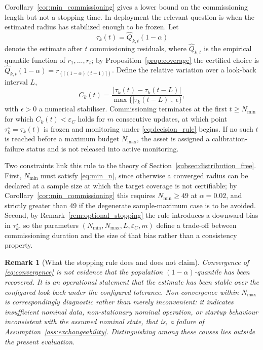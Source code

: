 \documentclass[a4paper]{cas-sc}
\newtheorem{remark}{Remark}
\newcommand{\residual}{\ensuremath{r}}
\begin{document}
Corollary~\ref{cor:min_commissioning} gives a lower bound on the
commissioning length but not a stopping time. In deployment the relevant
question is when the estimated radius has stabilized enough to be frozen.
Let
\begin{equation}
\tau_k(t) = \widehat{Q}_{k,t}(1-\alpha)
\label{eq:tau_online}
\end{equation}
denote the estimate after \(t\) commissioning residuals, where
\(\widehat{Q}_{k,t}\) is the empirical quantile function of
\(\residual_1,\ldots,\residual_t\); by
Proposition~\ref{prop:coverage} the certified choice is
\(\widehat{Q}_{k,t}(1-\alpha)=\residual_{(\lceil(1-\alpha)(t+1)\rceil)}\).
Define the relative variation over a look-back interval \(L\),
\begin{equation}
C_k(t)
=
\frac{\bigl|\tau_k(t)-\tau_k(t-L)\bigr|}
     {\max\bigl\{\bigl|\tau_k(t-L)\bigr|,\ \epsilon\bigr\}},
\label{eq:convergence}
\end{equation}
with \(\epsilon>0\) a numerical stabiliser. Commissioning terminates at the
first \(t\ge N_{\min}\) for which \(C_k(t)<\varepsilon_C\) holds for \(m\)
consecutive updates, at which point \(\tau_k^\star = \tau_k(t)\) is frozen
and monitoring under \eqref{eq:decision_rule} begins. If no such \(t\) is
reached before a maximum budget \(N_{\max}\), the asset is assigned a
calibration-failure status and is not released into active monitoring.

Two constraints link this rule to the theory of
Section~\ref{subsec:distribution_free}. First, \(N_{\min}\) must satisfy
\eqref{eq:min_n}, since otherwise a converged radius can be declared at a
sample size at which the target coverage is not certifiable; by
Corollary~\ref{cor:min_commissioning} this requires
\(N_{\min}\ge 49\) at \(\alpha=0.02\), and strictly greater than 49 if the
degenerate sample-maximum case is to be avoided. Second, by
Remark~\ref{rem:optional_stopping} the rule introduces a downward bias in
\(\tau_k^\star\), so the parameters
\((N_{\min},N_{\max},L,\varepsilon_C,m)\) define a trade-off between
commissioning duration and the size of that bias rather than a
consistency property.

\begin{remark}[What the stopping rule does and does not claim]
\label{rem:stopping_semantics}
Convergence of \eqref{eq:convergence} is not evidence that the population
\((1-\alpha)\)-quantile has been recovered. It is an operational statement
that the estimate has been stable over the configured look-back under the
configured tolerance. Non-convergence within \(N_{\max}\) is
correspondingly diagnostic rather than merely inconvenient: it indicates
insufficient nominal data, non-stationary nominal operation, or startup
behaviour inconsistent with the assumed nominal state, that is, a failure
of Assumption~\ref{ass:exchangeability}. Distinguishing among these causes
lies outside the present evaluation.
\end{remark}
\end{document}
